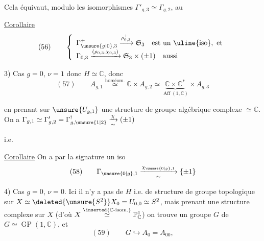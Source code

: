 Cela équivaut, modulo les isomorphismes $\Gamma'_{g,3}\simeq\Gamma_{g,2}$, au 

\uline{Corollaire}
\[
(56)\qquad\left\{\begin{array}{l}
\Gamma^+_{\unsure{g|0},3}\xrightarrow{\rho^+_{0,3}}\mathfrak S_3\quad\text{est un }\uline{\text{iso}},\text{ et}\\
\Gamma_{0,3}\xrightarrow{(\rho_{0,3},\chi_{0,3})}\mathfrak S_3\times(\pm1)\quad\text{aussi}
\end{array}\right.
\]


3) Cas $g=0$, $\nu=1$ donc $H\simeq\mathbb{C}$, donc
\[
(57)\qquad A_{g,1}\overset{\text{homéom.}}{\simeq}\mathbb{C}\times A_{g,2}\simeq\underbrace{\mathbb{C}\times\mathbb{C}^*}_{\operatorname{Aff}(1,\mathbb{C})}\times A_{g,3}
\]


en prenant sur $\unsure{U_{g,1}}$ une structure de groupe algébrique complexe $\simeq\mathbb{C}$.
On a  $\Gamma_{g,1}\simeq\Gamma'_{g,2}=\Gamma^!_{g,\unsure{1|2}}\xrightarrow[\sim]{\chi}(\pm1)$

i.e.

\uline{Corollaire} On a par la signature un iso
\[
(58)\qquad\Gamma_{\unsure{0|g},1}\xrightarrow[\sim]{\chi_{\unsure{0|g},1}}\{\pm1\}
\]

4) Cas $g=0$, $\nu=0$. Ici il n'y a pas de $H$ i.e. de structure de groupe topologique sur $X\simeq\deleted{\unsure{S^2}}X_0=U_{0,0}\simeq S^2$, mais prenant une structure complexe sur $X$ (d'où $X\overset{\inserted{\mathbb{C}\text{-isom.}}}{\simeq}\mathbb{P}^1_{\mathbb{C}}$) on trouve un groupe $G$ de   $G\simeq\operatorname{GP}(1,\mathbb{C})$, et
\[
(59)\qquad G\hookrightarrow A_0=A_{00},
\]

